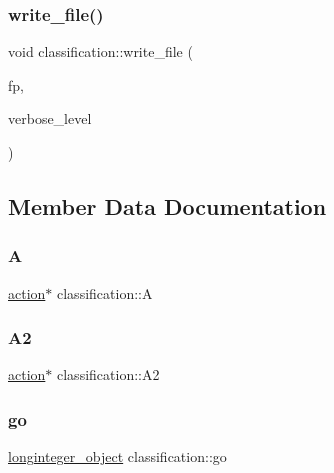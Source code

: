 \subsubsection{\texorpdfstring{write\+\_\+file()}{write\_file()}}
{\footnotesize\ttfamily void classification\+::write\+\_\+file (\begin{DoxyParamCaption}\item[{ofstream \&}]{fp,  }\item[{\mbox{\hyperlink{galois_8h_a09fddde158a3a20bd2dcadb609de11dc}{I\+NT}}}]{verbose\+\_\+level }\end{DoxyParamCaption})}



\subsection{Member Data Documentation}
\mbox{\label{classclassification_a3b0380ab416e2a8fbde7d39e9503a0bb}} 
\subsubsection{\texorpdfstring{A}{A}}
{\footnotesize\ttfamily \mbox{\hyperlink{classaction}{action}}$\ast$ classification\+::A}

\mbox{\label{classclassification_a756909effb5b0b01b3f389205a4bc05a}} 
\subsubsection{\texorpdfstring{A2}{A2}}
{\footnotesize\ttfamily \mbox{\hyperlink{classaction}{action}}$\ast$ classification\+::\+A2}

\mbox{\label{classclassification_a386d68ab8ebe2cb336997d0d44711896}} 
\subsubsection{\texorpdfstring{go}{go}}
{\footnotesize\ttfamily \mbox{\hyperlink{classlonginteger__object}{longinteger\+\_\+object}} classification\+::go}

